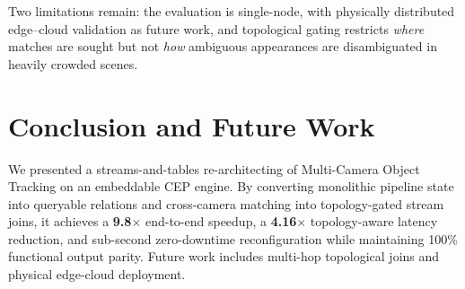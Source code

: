 \documentclass[conference]{IEEEtran}
\begin{document}
Two limitations remain: the evaluation is single-node, with physically distributed edge--cloud validation as future work, and topological gating restricts \emph{where} matches are sought but not \emph{how} ambiguous appearances are disambiguated in heavily crowded scenes.

\section{Conclusion and Future Work}
\label{sec:conclusion}
We presented a streams-and-tables re-architecting of Multi-Camera Object Tracking on an embeddable CEP engine. By converting monolithic pipeline state into queryable relations and cross-camera matching into topology-gated stream joins, it achieves a \textbf{9.8$\times$} end-to-end speedup, a \textbf{4.16$\times$} topology-aware latency reduction, and sub-second zero-downtime reconfiguration while maintaining 100\% functional output parity. Future work includes multi-hop topological joins and physical edge-cloud deployment.

{\footnotesize


}
\end{document}

